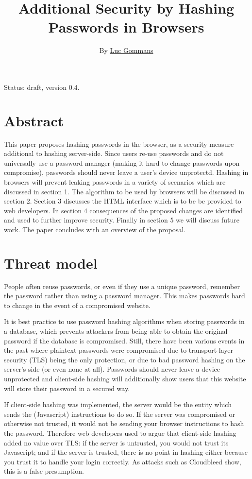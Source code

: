 \documentclass{paper}
\begin{document}
\title{Additional Security by Hashing Passwords in Browsers}
\author{By \href{https://lgms.nl}{Luc Gommans}}

\maketitle

Status: draft, version 0.4.

\section*{Abstract}

This paper proposes hashing passwords in the browser, as a security measure additional to
hashing server-side. Since users re-use passwords and do not universally use a password
manager (making it hard to change passwords upon compromise), passwords should never leave
a user's device unprotectd. Hashing in browsers will prevent leaking passwords in a variety
of scenarios which are discussed in section 1. The algorithm to be used by browsers will be
discussed in section 2. Section 3 discusses the HTML interface which is to be be provided to
web developers. In section 4 consequences of the proposed changes are identified and used to
further improve security. Finally in section 5 we will discuss future work. The paper
concludes with an overview of the proposal.

\section{Threat model}

People often reuse passwords, or even if they use a unique password, remember the password
rather than using a password manager. This makes passwords hard to change in the event of a
compromised website.

It is best practice to use password hashing algorithms when storing passwords in a database,
which prevents attackers from being able to obtain the original password if the database is
compromised. Still, there have been various events in the past where plaintext passwords were
compromised due to transport layer security (TLS) being the only protection, or due to bad
password hashing on the server's side (or even none at all). Passwords should never leave a
device unprotected and client-side hashing will additionally show users that this website
will store their password in a secured way.

If client-side hashing was implemented, the server would be the entity which sends the
(Javascript) instructions to do so. If the server was compromised or otherwise not trusted,
it would not be sending your browser instructions to hash the password. Therefore web
developers used to argue that client-side hashing added no value over TLS: if the server is
untrusted, you would not trust its Javascript; and if the server is trusted, there is no
point in hashing either because you trust it to handle your login correctly. As attacks such
as Cloudbleed show, this is a false presumption.
\end{document}

